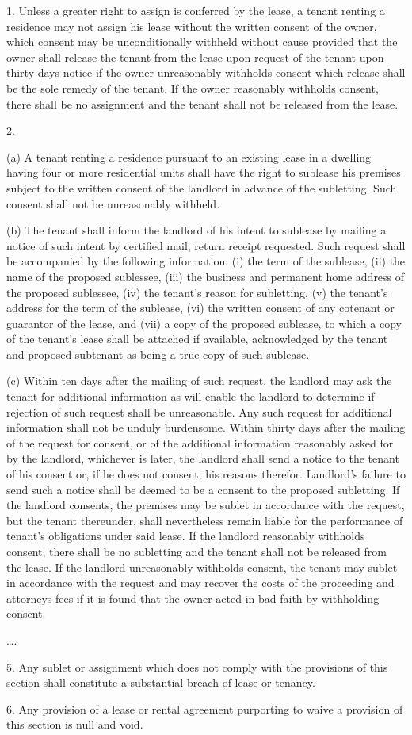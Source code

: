 
1. Unless a greater right to assign is conferred by the lease, a tenant renting
a residence may not assign his lease without the written consent of the owner,
which consent may be unconditionally withheld without cause provided that the
owner shall release the tenant from the lease upon request of the tenant upon
thirty days notice if the owner unreasonably withholds consent which release
shall be the sole remedy of the tenant. If the owner reasonably withholds
consent, there shall be no assignment and the tenant shall not be released from
the lease.

2.
\begin{statute}
\item (a) A tenant renting a residence pursuant to an existing lease in a
dwelling having four or more residential units shall have the right to sublease
his premises subject to the written consent of the landlord in advance of the
subletting. Such consent shall not be unreasonably withheld.

\item (b) The tenant shall inform the landlord of his intent to sublease by
mailing a notice of such intent by certified mail, return receipt requested.
Such request shall be accompanied by the following information: (i) the term of
the sublease, (ii) the name of the proposed sublessee, (iii) the business and
permanent home address of the proposed sublessee, (iv) the tenant's reason for
subletting, (v) the tenant's address for the term of the sublease, (vi) the
written consent of any cotenant or guarantor of the lease, and (vii) a copy of
the proposed sublease, to which a copy of the tenant's lease shall be attached
if available, acknowledged by the tenant and proposed subtenant as being a true
copy of such sublease.

\item (c) Within ten days after the mailing of such request, the landlord may
ask the tenant for additional information as will enable the landlord to
determine if rejection of such request shall be unreasonable. Any such request
for additional information shall not be unduly burdensome. Within thirty days
after the mailing of the request for consent, or of the additional information
reasonably asked for by the landlord, whichever is later, the landlord shall
send a notice to the tenant of his consent or, if he does not consent, his
reasons therefor. Landlord's failure to send such a notice shall be deemed to be
a consent to the proposed subletting. If the landlord consents, the premises may
be sublet in accordance with the request, but the tenant thereunder, shall
nevertheless remain liable for the performance of tenant's obligations under
said lease. If the landlord reasonably withholds consent, there shall be no
subletting and the tenant shall not be released from the lease. If the landlord
unreasonably withholds consent, the tenant may sublet in accordance with the
request and may recover the costs of the proceeding and attorneys fees if it is
found that the owner acted in bad faith by withholding consent.
\end{statute}
\dots.

5. Any sublet or assignment which does not comply with the provisions of this
section shall constitute a substantial breach of lease or tenancy.

6. Any provision of a lease or rental agreement purporting to waive a provision
of this section is null and void. 

